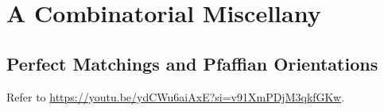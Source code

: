 
\chapter{A Combinatorial Miscellany}





\section{Perfect Matchings and Pfaffian Orientations}
Refer to \href{https://youtu.be/ydCWu6aiAxE?si=v91XmPDjM3qkfGKw}{https://youtu.be/ydCWu6aiAxE?si=v91XmPDjM3qkfGKw}. 
